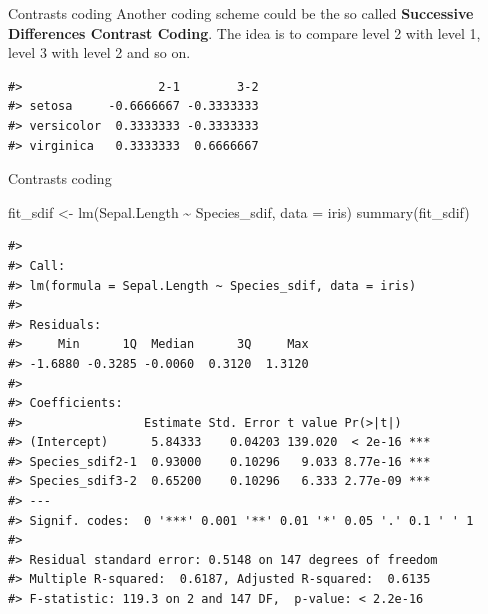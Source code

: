 \documentclass[
  ignorenonframetext,
]{beamer}
\newenvironment{Shaded}{\begin{snugshade}}{\end{snugshade}}
\newcommand{\AttributeTok}[1]{\textcolor[rgb]{0.40,0.45,0.13}{#1}}
\newcommand{\DecValTok}[1]{\textcolor[rgb]{0.68,0.00,0.00}{#1}}
\newcommand{\FunctionTok}[1]{\textcolor[rgb]{0.28,0.35,0.67}{#1}}
\newcommand{\NormalTok}[1]{\textcolor[rgb]{0.00,0.23,0.31}{#1}}
\newcommand{\OtherTok}[1]{\textcolor[rgb]{0.00,0.23,0.31}{#1}}
\newcommand{\SpecialCharTok}[1]{\textcolor[rgb]{0.37,0.37,0.37}{#1}}
\begin{document}
\begin{frame}[fragile]{Contrasts coding}
\label{contrasts-coding-4}
Another coding scheme could be the so called \textbf{Successive
Differences Contrast Coding}. The idea is to compare level 2 with level
1, level 3 with level 2 and so on.

\begin{Shaded}
\end{Shaded}

\begin{verbatim}
#>                   2-1        3-2
#> setosa     -0.6666667 -0.3333333
#> versicolor  0.3333333 -0.3333333
#> virginica   0.3333333  0.6666667
\end{verbatim}
\end{frame}

\begin{frame}[fragile]{Contrasts coding}
\label{contrasts-coding-5}
\begin{Shaded}
\begin{Highlighting}[]
\NormalTok{fit\_sdif }\OtherTok{\textless{}{-}} \FunctionTok{lm}\NormalTok{(Sepal.Length }\SpecialCharTok{\textasciitilde{}}\NormalTok{ Species\_sdif, }\AttributeTok{data =}\NormalTok{ iris)}
\FunctionTok{summary}\NormalTok{(fit\_sdif)}
\end{Highlighting}
\end{Shaded}

\begin{verbatim}
#> 
#> Call:
#> lm(formula = Sepal.Length ~ Species_sdif, data = iris)
#> 
#> Residuals:
#>     Min      1Q  Median      3Q     Max 
#> -1.6880 -0.3285 -0.0060  0.3120  1.3120 
#> 
#> Coefficients:
#>                 Estimate Std. Error t value Pr(>|t|)    
#> (Intercept)      5.84333    0.04203 139.020  < 2e-16 ***
#> Species_sdif2-1  0.93000    0.10296   9.033 8.77e-16 ***
#> Species_sdif3-2  0.65200    0.10296   6.333 2.77e-09 ***
#> ---
#> Signif. codes:  0 '***' 0.001 '**' 0.01 '*' 0.05 '.' 0.1 ' ' 1
#> 
#> Residual standard error: 0.5148 on 147 degrees of freedom
#> Multiple R-squared:  0.6187, Adjusted R-squared:  0.6135 
#> F-statistic: 119.3 on 2 and 147 DF,  p-value: < 2.2e-16
\end{verbatim}
\end{frame}
\end{document}
